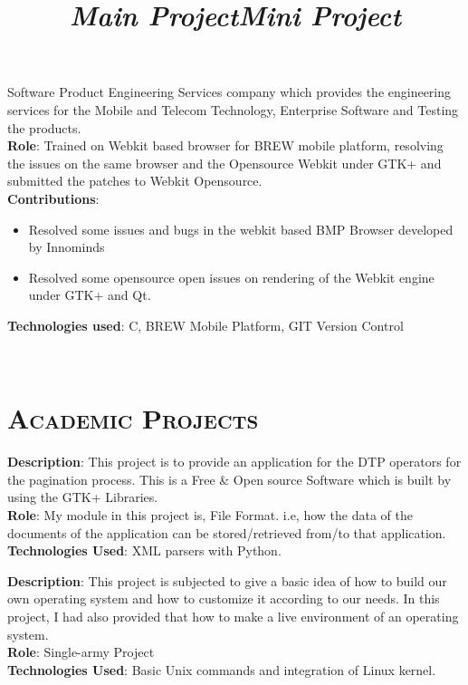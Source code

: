 \begin{resume}
\begin{position}
Software Product Engineering Services company which provides the
engineering services for the Mobile and Telecom Technology, Enterprise
Software and Testing the products.\\
\textbf{Role}: Trained on Webkit based browser for BREW mobile
platform, resolving the issues on the same browser and the Opensource
Webkit under GTK+ and submitted the patches to Webkit Opensource.\\
\textbf{Contributions}: 
\begin{itemize}
\item Resolved some issues and bugs in the webkit based BMP Browser
  developed by Innominds
\item Resolved some opensource open issues on rendering of the Webkit
  engine under GTK+ and Qt.
\end{itemize}
\textbf{Technologies used}: C, BREW Mobile Platform, GIT Version
Control  
\end{position}
\\


\section{\textsc{Academic Projects}}
\title{\em \textbf{Main Project}}
\begin{position}
\textbf{Description}: This project is to provide an application for
the DTP operators for the pagination process. This is a Free \& Open
source Software which is built by using the GTK+ Libraries.\\
\textbf{Role}: My module in this project is, File Format. i.e, how the
data of the documents of the application can be stored/retrieved
from/to that application.\\
\textbf{Technologies Used}: XML parsers with Python.\\
\end{position}
\title{\em \textbf{Mini Project}}
\begin{position}
\textbf{Description}: This project is subjected to give a basic idea
of how to build our own operating system and how  to  customize it
according to our needs. In this project, I had also provided that how
to make a live environment of an operating system.\\
\textbf{Role}: Single-army Project\\
\textbf{Technologies Used}: Basic Unix commands and integration of
Linux kernel.\\
\end{position}



\end{resume}
